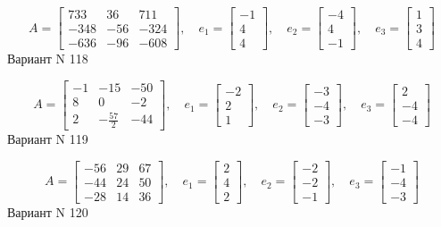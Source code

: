 \documentclass[11pt]{report}
\begin{document}
$$A = \left[\begin{matrix}733 & 36 & 711\\-348 & -56 & -324\\-636 & -96 & -608\end{matrix}\right],\quad e_1 = \left[\begin{matrix}-1\\4\\4\end{matrix}\right],\quad e_2 = \left[\begin{matrix}-4\\4\\-1\end{matrix}\right],\quad e_3 = \left[\begin{matrix}1\\3\\4\end{matrix}\right]$$Вариант N 118

$$A = \left[\begin{matrix}-1 & -15 & -50\\8 & 0 & -2\\2 & - \frac{57}{2} & -44\end{matrix}\right],\quad e_1 = \left[\begin{matrix}-2\\2\\1\end{matrix}\right],\quad e_2 = \left[\begin{matrix}-3\\-4\\-3\end{matrix}\right],\quad e_3 = \left[\begin{matrix}2\\-4\\-4\end{matrix}\right]$$Вариант N 119

$$A = \left[\begin{matrix}-56 & 29 & 67\\-44 & 24 & 50\\-28 & 14 & 36\end{matrix}\right],\quad e_1 = \left[\begin{matrix}2\\4\\2\end{matrix}\right],\quad e_2 = \left[\begin{matrix}-2\\-2\\-1\end{matrix}\right],\quad e_3 = \left[\begin{matrix}-1\\-4\\-3\end{matrix}\right]$$Вариант N 120
\end{document}

